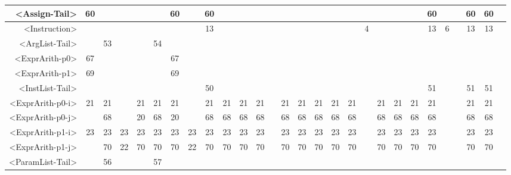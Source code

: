 \begin{tabular}{r|c@{ }c@{ }c@{ }c@{ }c@{ }c@{ }c@{ }c@{ }c@{ }c@{ }c@{ }c@{ }c@{ }c@{ }c@{ }c@{ }c@{ }c@{ }c@{ }c@{ }c@{ }c@{ }c@{ }c@{ }c@{ }c@{ }c@{ }}
<Assign-Tail> & 60 &   &   &   &   & 60 &   & 60 &   &   &   &   &   &   &   &   &   &   &   &   &   & 60 &   &   & 60 & 60 &   \\\hline
<Instruction> &   &   &   &   &   &   &   & 13 &   &   &   &   &   &   &   &   &   & 4 &   &   &   & 13 & 6 &   & 13 & 13 &   \\\hline
<ArgList-Tail> &   & 53 &   &   & 54 &   &   &   &   &   &   &   &   &   &   &   &   &   &   &   &   &   &   &   &   &   &   \\\hline
<ExprArith-p0> & 67 &   &   &   &   & 67 &   &   &   &   &   &   &   &   &   &   &   &   &   &   &   &   &   &   &   &   &   \\\hline
<ExprArith-p1> & 69 &   &   &   &   & 69 &   &   &   &   &   &   &   &   &   &   &   &   &   &   &   &   &   &   &   &   &   \\\hline
<InstList-Tail> &   &   &   &   &   &   &   & 50 &   &   &   &   &   &   &   &   &   &   &   &   &   & 51 &   &   & 51 & 51 &   \\\hline
<ExprArith-p0-i> & 21 & 21 &   & 21 & 21 & 21 &   & 21 & 21 & 21 & 21 &   & 21 & 21 & 21 & 21 & 21 &   & 21 & 21 & 21 & 21 &   &   & 21 & 21 &   \\\hline
<ExprArith-p0-j> &   & 68 &   & 20 & 68 & 20 &   & 68 & 68 & 68 & 68 &   & 68 & 68 & 68 & 68 & 68 &   & 68 & 68 & 68 & 68 &   &   & 68 & 68 &   \\\hline
<ExprArith-p1-i> & 23 & 23 & 23 & 23 & 23 & 23 & 23 & 23 & 23 & 23 & 23 &   & 23 & 23 & 23 & 23 & 23 &   & 23 & 23 & 23 & 23 &   &   & 23 & 23 &   \\\hline
<ExprArith-p1-j> &   & 70 & 22 & 70 & 70 & 70 & 22 & 70 & 70 & 70 & 70 &   & 70 & 70 & 70 & 70 & 70 &   & 70 & 70 & 70 & 70 &   &   & 70 & 70 &   \\\hline
<ParamList-Tail> &   & 56 &   &   & 57 &   &   &   &   &   &   &   &   &   &   &   &   &   &   &   &   &   &   &   &   &   &   \\\hline
\end{tabular}


